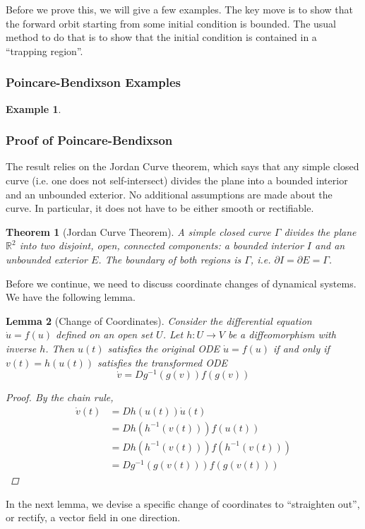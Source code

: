 \documentclass{article}
\newtheorem{theorem}{Theorem}[section]
\newtheorem{lemma}[theorem]{Lemma}
\newtheorem{example}{Example}[section]
\def\R{{\mathbb R}}
\begin{document}
Before we prove this, we will give a few examples. The key move is to show that the forward orbit starting from some initial condition is bounded. The usual method to do that is to show that the initial condition is contained in a ``trapping region''.

\subsubsection{Poincare-Bendixson Examples}
\begin{example}
\end{example}

\subsubsection{Proof of Poincare-Bendixson}

The result relies on the Jordan Curve theorem, which says that any simple closed curve (i.e. one does not self-intersect) divides the plane into a bounded interior and an unbounded exterior. No additional assumptions are made about the curve. In particular, it does not have to be either smooth or rectifiable. 

\begin{theorem}[Jordan Curve Theorem]A simple closed curve $\Gamma$ divides the plane $\R^2$ into two disjoint, open, connected components: a bounded interior $I$ and an unbounded exterior $E$. The boundary of both regions is $\Gamma$, i.e. $\partial I = \partial E = \Gamma$.
\end{theorem}

Before we continue, we need to discuss coordinate changes of dynamical systems. We have the following lemma.

\begin{lemma}[Change of Coordinates]
Consider the differential equation $\dot{u} = f(u)$ defined on an open set $U$. Let $h: U \rightarrow V$ be a diffeomorphism with inverse $h$. Then $u(t)$ satisfies the original ODE $\dot{u} = f(u)$ if and only if $v(t) = h(u(t))$ satisfies the transformed ODE
\[
\dot{v} = Dg^{-1}(g(v))f(g(v))
\]
\begin{proof}
By the chain rule,
\begin{align*}
\dot{v}(t) &= Dh(u(t))\dot{u}(t) \\
&= Dh(h^{-1}(v(t))) f(u(t)) \\
&= Dh(h^{-1}(v(t))) f(h^{-1}(v(t))) \\
&= Dg^{-1}(g(v(t))) f(g(v(t))) 
\end{align*}
\end{proof}
\end{lemma}

In the next lemma, we devise a specific change of coordinates to ``straighten out'', or rectify, a vector field in one direction.
\end{document}
